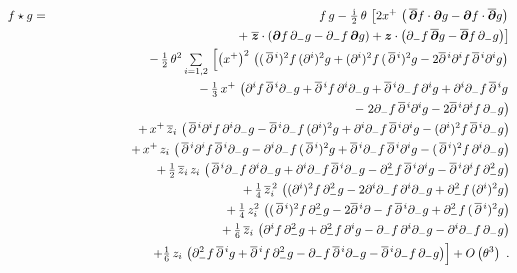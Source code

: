 \documentclass[11pt,a4paper]{article}
\def\nn{\nonumber}
\def\d{\partial}
\newcommand{\1}{\mathbb{1}}
\newcommand{\mbf}[1]{{\boldsymbol {#1} }}
\def\ii{{\,{\rm i}\,}}
\def\mz{{\mbf z}}
\def\mdell{{\mbf\partial}}
\def\nn{\nonumber}
\def\d{\partial}
\begin{document}
\begin{eqnarray}
  \label{eq:weyl:positionspace}
  f\star g&=&f\,g-\mbox{$\frac{\ii}2$}\,\theta\,\left[
  2x^+\,\left(\,\overline{\mdell}f\cdot\mdell g
  - \mdell f\cdot\overline{\mdell}g\right)\right.\\\nonumber
  &&\qquad\qquad\qquad+\left.\overline{\mz}\cdot\left(\mdell f\,\d_- g
  - \d_- f\,\mdell g\right)+ \mz\cdot\left(\d_- f\,\overline{\mdell}g
   - \overline{\mdell}f\,\d_- g\right)\right]\\ \nonumber
  &&-\,\mbox{$\frac1{2}$}\,\theta^2\,\mbox{$\sum\limits_{i=1,2}$}\,\left[
  \left(x^+\right)^2\,
  \left((\,\overline{\d}{}^{\,i})^2f\,(\d^i)^2g
  +(\d^i)^2f\,(\,\overline{\d}{}^{\,i})^2g
  -2\overline{\d}{}^{\,i}\d^if\,\overline{\d}{}^{\,i}\d^ig
  \right)\right.\\ \nonumber &&\qquad\qquad\quad\quad
  -\,\mbox{$\frac13$}\,x^+\,\left(\d^if\,\overline{\d}{}^{\,i}\d_- g
  +\overline{\d}{}^{\,i}f\,\d^i\d_- g
  +\overline{\d}{}^{\,i}\d_- f\,\d^ig
  +\d^i\d_- f\,\overline{\d}{}^{\,i}g\right.\\ \nonumber
  &&\qquad\qquad\qquad\qquad\qquad\quad\quad
  -\left.2\partial_-f\,\overline{\d}{}^{\,i}
  \d^ig-2\overline{\d}{}^{\,i}\partial^if\,
  \partial_-g\right)\\\nonumber&&\qquad\qquad\quad\quad
  +\,x^+\,\overline{z}_i\,\left(\,\overline{\d}{}^{\,i}
  \d^if\,\d^i\d_- g
  -\overline{\d}{}^{\,i}\d_- f\,(\d^i)^2g
  +\d^i\d_- f\,\overline{\d}{}^{\,i}\d^ig
  -(\d^i)^2f\,\overline{\d}{}^{\,i}\d_- g\right)
  \\ \nonumber &&\qquad\qquad\quad\quad
  +\,x^+\,z_i\,\left(\,\overline{\d}{}^{\,i}\d^if\,\overline{\d}{}^{\,i}\d_- g
  -\d^i\d_- f\,(\,\overline{\d}{}^{\,i})^2g
  +\overline{\d}{}^{\,i}\d_- f\,\overline{\d}{}^{\,i}\d^ig
  -(\,\overline{\d}{}^{\,i})^2f\,\d^i\d_- g\right)\\ \nonumber
  &&\qquad\qquad\quad\quad
  +\,\mbox{$\frac12$}\,\overline{z}_i\,z_i\,\left(\,
  \overline{\d}{}^{\,i}\d_- f\,\d^i\d_- g
  +\d^i\d_- f\,\overline{\d}{}^{\,i}\d_- g
  -\d_- ^2f\,\overline{\d}{}^{\,i}\d^ig
  -\overline{\d}{}^{\,i}\d^if\,\d_-^2g\right)
  \\ \nonumber &&\qquad\qquad\quad\quad
  +\,\mbox{$\frac14$}\,\overline{z}_i^{\,2}\,
  \left((\d^i)^2f\,\d_-^2g
  -2\d^i\d_- f\,\d^i\d_- g
  +\d_-^2f\,(\d^i)^2g\right)\\ \nonumber &&\qquad\qquad\quad\quad
  +\,\mbox{$\frac14$}\,z_i^2\,
  \left((\,\overline{\d}{}^{\,i})^2f\,\d_-^2g
  -2\overline{\d}{}^{\,i}\d- f\,\overline{\d}{}^{\,i}\d_- g
  +\d_-^2f\,(\,\overline{\d}{}^{\,i})^2g\right)
  \\ \nonumber &&\qquad\qquad\quad\quad
  +\,\mbox{$\frac16$}\,\overline{z}_i\,\left(\d^if\,\d_-^2g
  +\d_-^2f\,\d^ig-\partial_-f\,\partial^i
  \partial_-g-\partial^i\partial_-f\,\partial_-g\right)
  \\&&\qquad\qquad\quad\quad
  +\Bigl.\mbox{$\frac16$}\,z_i\,\left(\d_-^2f\,\overline{\d}{}^{\,i}g
+\overline{\d}{}^{\,i}f\,\d_-^2g-\partial_-f\,
\overline{\partial}{}^{\,i}\d_-g-
  \overline{\d}{}^{\,i}\d_-f\,\d_-g\right)
  \Bigr]+O\left(\theta^3\right) \ . \nn\\ &&
\end{eqnarray}
\end{document}
